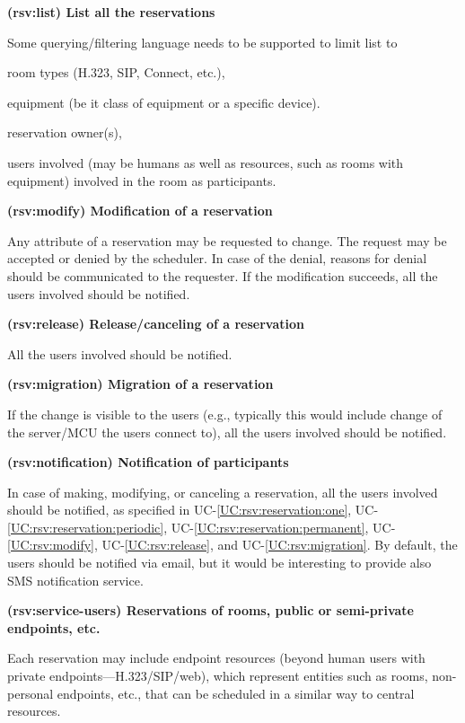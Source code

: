\documentclass[a4paper]{report}
\makeatletter
\newcounter{UCcounter}
\newenvironment{UseCases}%
	{\begin{list}{\textbf{UC-\arabic{UCcounter}}}{\@nmbrlisttrue\def\@listctr{UCcounter}}}%
	{\end{list}}
\newcommand{\UClabel}[1]{\label{UC:#1}}
\newcommand{\UCref}[1]{UC-\ref{UC:#1}}
\newcommand{\UseCase}[2]{\item\UClabel{#2} \textbf{(#2) #1}\\ \nopagebreak}
\makeatother
\begin{document}
\begin{UseCases}
\UseCase{List all the reservations}{rsv:list}

Some querying/filtering language needs to be supported to limit list to

\begin{compactitem}

\item room types (H.323, SIP, Connect, etc.),

\item equipment (be it class of equipment or a specific device).

\item reservation owner(s),

\item users involved (may be humans as well as resources, such as rooms with
equipment) involved in the room as participants.

\end{compactitem}

\UseCase{Modification of a reservation}{rsv:modify}

Any attribute of a reservation may be requested to change. The request may be
accepted or denied by the scheduler. In case of the denial, reasons for denial
should be communicated to the requester. If the modification succeeds, all the
users involved should be notified.

\UseCase{Release/canceling of a reservation}{rsv:release}

All the users involved should be notified.

\UseCase{Migration of a reservation}{rsv:migration}

If the change is visible to the users (e.g., typically this would include
change of the server/MCU the users connect to), all the users involved should
be notified.

\UseCase{Notification of participants}{rsv:notification}

In case of making, modifying, or canceling a reservation, all the users
involved should be notified, as specified in \UCref{rsv:reservation:one},
\UCref{rsv:reservation:periodic}, \UCref{rsv:reservation:permanent},
\UCref{rsv:modify}, \UCref{rsv:release}, and \UCref{rsv:migration}. By default,
the users should be notified via email, but it would be interesting to provide
also SMS notification service.

\UseCase{Reservations of rooms, public or semi-private endpoints,
etc.}{rsv:service-users}

Each reservation may include endpoint resources (beyond human users with
private endpoints---H.323/SIP/web), which represent entities such as rooms,
non-personal endpoints, etc., that can be scheduled in a similar way to central
resources.


\end{UseCases}
\end{document}
